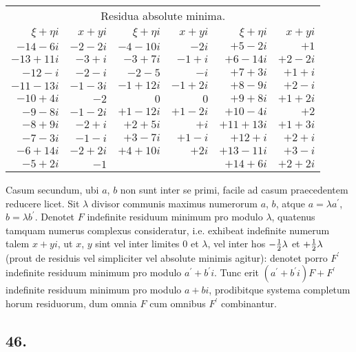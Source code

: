 \documentclass[twoside,12pt, showframe]{memoir}
\let\oldfrac\frac
\def\frac#1#2{\mathchoice{\tfrac{#1}{#2}}{\oldfrac{#1}{#2}}{\genfrac{}{}{}{2}{#1}{#2\mathstrut}}{\genfrac{}{}{}{3}{#1}{#2\mathstrut}}}
\begin{document}
\begin{center}
\begin{tabular}{r|r||r|r||r|r}
\multicolumn{6}{c}{Residua absolute minima.}\\
\(\xi+\eta i\) & \(x+y i\) & \(\xi+\eta i\) & \(x+y i\) & \(\xi+\eta i\) & \(x+y i\) \\
\hline
\(-14-6 i\) & \(-2-2 i\) & \(-4-10 i\) & \(-2 i\) & \(+5-2 i\) & \(+1\) \\
\(-13+11 i\) & \(-3+i\) & \(-3+7 i\) & \(-1+i\) & \(+6-14 i\) & \(+2-2 i\) \\
\(-12-i\) & \(-2-i\) & \(-2-5\) & \(-i\) & \(+7+3 i\) & \(+1+i\) \\
\(-11-13 i\) & \(-1-3 i\) & \(-1+12 i\) & \(-1+2 i\) & \(+8-9 i\) & \(+2-i\) \\
\(-10+4 i\) & \(-2\) & \(0\) & \(0\) & \(+9+8 i\) & \(+1+2 i\) \\
\(-9-8 i\) & \(-1-2 i\) & \(+1-12 i\) & \(+1-2 i\) & \(+10-4 i\) & \(+2\) \\
\(-8+9 i\) & \(-2+i\) & \(+2+5 i\) & \(+i\) & \(+11+13 i\) & \(+1+3 i\) \\
\(-7-3 i\) & \(-1-i\) & \(+3-7 i\) & \(+1-i\) & \(+12+i\) & \(+2+i\) \\
\(-6+14 i\) & \(-2+2 i\) & \(+4+10 i\) & \(+2 i\) & \(+13-11 i\) & \(+3-i\) \\
\(-5+2 i\) & \(-1\) &\multicolumn{2}{c||}{}  & \(+14+6 i\) & \(+2+2 i\) \\
\end{tabular}
\end{center}

Casum secundum, ubi \(a\), \(b\) non sunt inter se primi, facile ad casum praecedentem reducere licet. Sit \(\lambda\) divisor communis maximus numerorum \(a\), \(b\), atque \(a=\lambda a^{\prime}\), \(b=\lambda b^{\prime}\). Denotet \({F}\) indefinite residuum minimum pro modulo \(\lambda\), quatenus tamquam numerus complexus consideratur, i.e. exhibeat indefinite numerum talem \(x+y i\), ut \(x\), \(y\) sint vel inter limites \(0\) et \(\lambda\), vel inter hos \(-\frac{1}{2} \lambda\) et \(+\frac{1}{2} \lambda\) (prout de residuis vel simpliciter vel absolute minimis agitur): denotet porro \(F^{\prime}\) indefinite residuum minimum pro modulo \(a^{\prime}+b^{\prime} i\). Tunc erit \((a^{\prime}+b^{\prime} i) F+F^{\prime}\) indefinite residuum minimum pro modulo \(a+b i\), prodibitque systema completum horum residuorum, dum omnia \(F\) cum omnibus \(F^{\prime}\) combinantur.

\subsection*{46.}
 
\end{document}
